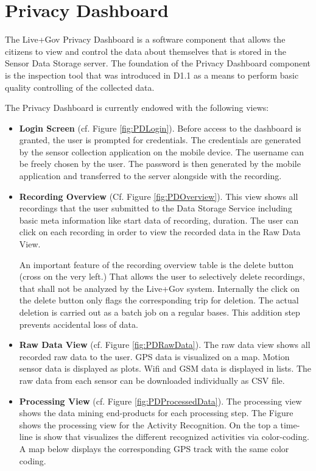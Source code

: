 \section{Privacy Dashboard}
The Live+Gov Privacy Dashboard is a software component that allows the
citizens to view and control the data about themselves that is stored
in the Sensor Data Storage server.  The foundation of the Privacy
Dashboard component is the inspection tool that was introduced in D1.1
as a means to perform basic quality controlling of the collected data.

The Privacy Dashboard is currently endowed with the following views:
\begin{itemize}
  \item \textbf{Login Screen} (cf. Figure \ref{fig:PDLogin}).  Before
    access to the dashboard is granted, the user is prompted for
    credentials.  The credentials are generated by the sensor
    collection application on the mobile device.  The username can be
    freely chosen by the user. The password is then generated by the
    mobile application and transferred to the server alongside with
    the recording.

 \item \textbf{Recording Overview} (Cf. Figure \ref{fig:PDOverview}).
   This view shows all recordings that the user submitted to the Data
   Storage Service including basic meta information like start data of
   recording, duration. The user can click on each recording in order
   to view the recorded data in the Raw Data View.

   An important feature of the recording overview table is the delete
   button (cross on the very left.) That allows the user to
   selectively delete recordings, that shall not be analyzed by the
   Live+Gov system. Internally the click on the delete button only
   flags the corresponding trip for deletion. The actual deletion is
   carried out as a batch job on a regular bases. This addition step
   prevents accidental loss of data.

 \item \textbf{Raw Data View} (cf. Figure \ref{fig:PDRawData}).
   The raw data view shows all recorded raw data to the user.  GPS
   data is visualized on a map. Motion sensor data is displayed as
   plots. Wifi and GSM data is displayed in lists.  The raw data from
   each sensor can be downloaded individually as CSV file.

 \item \textbf{Processing View} (cf. Figure \ref{fig:PDProcessedData}).
   The processing view shows the data mining end-products for each
   processing step.  The Figure shows the processing view for the
   Activity Recognition. On the top a time-line is show that
   visualizes the different recognized activities via color-coding. A
   map below displays the corresponding GPS track with the same color
   coding.


\end{itemize}
